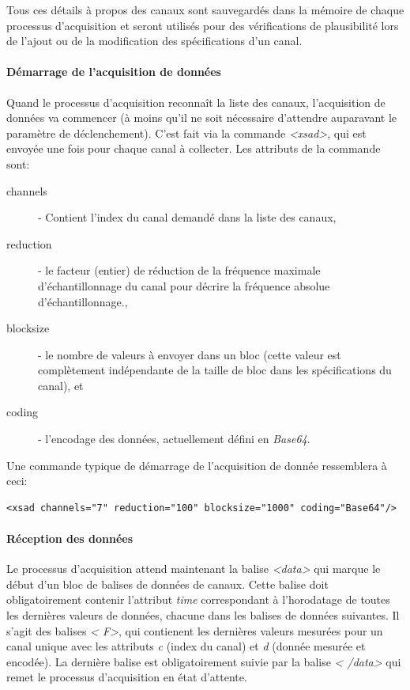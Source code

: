 \documentclass[a4paper,12pt,BCOR6mm,bibtotoc,idxtotoc]{scrbook}
\begin{document}
Tous ces d\'etails \`a propos des canaux sont sauvegard\'es dans la
m\'emoire de chaque processus d'acquisition et seront utilis\'es pour
des v\'erifications de plausibilit\'e lors de l'ajout ou de la
modification des sp\'ecifications d'un canal.

\paragraph{D\'emarrage de l'acquisition de donn\'ees}
Quand le processus d'acquisition reconna\^it la liste des canaux,
l'acquisition de donn\'ees va commencer (\`a moins qu'il ne soit
n\'ecessaire d'attendre auparavant le param\`etre de d\'eclenchement).
C'est fait via la commande \textit{\textless xsad\textgreater}, qui
est envoy\'ee une fois pour chaque canal \`a collecter. Les attributs
de la commande sont:

\begin{description}

\item[channels] - Contient l'index du canal demand\'e dans la liste
  des canaux,

\item[reduction] - le facteur (entier) de r\'eduction de la
  fr\'equence maximale d'\'echantillonnage du canal pour d\'ecrire la
  fr\'equence absolue d'\'echantillonnage.,

\item[blocksize] - le nombre de valeurs \`a envoyer dans un bloc (cette
  valeur est compl\`etement ind\'ependante de la taille de bloc dans
  les sp\'ecifications du canal), et

\item[coding] - l'encodage des donn\'ees, actuellement d\'efini en
  \textit{Base64}.

\end{description}

Une commande typique de d\'emarrage de l'acquisition de donn\'ee ressemblera \`a
ceci:

\begin{lstlisting}[basicstyle=\ttfamily\scriptsize]
<xsad channels="7" reduction="100" blocksize="1000" coding="Base64"/>
\end{lstlisting}

\paragraph{R\'eception des donn\'ees}
Le processus d'acquisition attend maintenant la balise
\textit{\textless data\textgreater} qui marque le d\'ebut d'un bloc de
balises de donn\'ees de canaux.  Cette balise doit obligatoirement
contenir l'attribut \textit{time} correspondant \`a l'horodatage de
toutes les derni\`eres valeurs de donn\'ees, chacune dans les balises
de donn\'ees suivantes.  Il s'agit des balises \textit{\textless
  F\textgreater}, qui contienent les derni\`eres valeurs mesur\'ees
pour un canal unique avec les attributs \textit{c} (index du canal) et
\textit{d} (donn\'ee mesur\'ee et encod\'ee).  La derni\`ere balise
est obligatoirement suivie par la balise \textit{\textless
  /data\textgreater} qui remet le processus d'acquisition en \'etat
d'attente.
\end{document}
